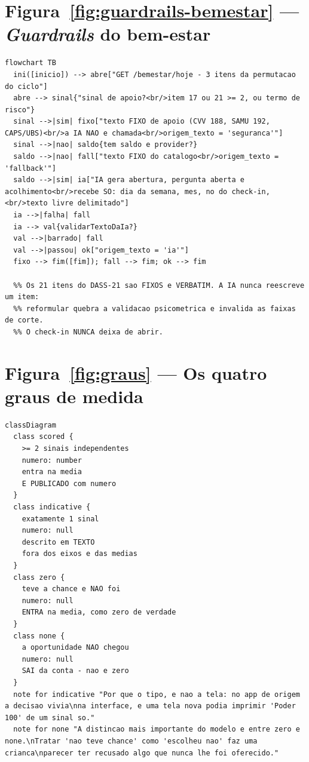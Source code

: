 \section{Figura~\ref{fig:guardrails-bemestar} --- \emph{Guardrails} do bem-estar}

\begin{lstlisting}[language=mermaid]
flowchart TB
  ini([inicio]) --> abre["GET /bemestar/hoje - 3 itens da permutacao do ciclo"]
  abre --> sinal{"sinal de apoio?<br/>item 17 ou 21 >= 2, ou termo de risco"}
  sinal -->|sim| fixo["texto FIXO de apoio (CVV 188, SAMU 192, CAPS/UBS)<br/>a IA NAO e chamada<br/>origem_texto = 'seguranca'"]
  sinal -->|nao| saldo{tem saldo e provider?}
  saldo -->|nao| fall["texto FIXO do catalogo<br/>origem_texto = 'fallback'"]
  saldo -->|sim| ia["IA gera abertura, pergunta aberta e acolhimento<br/>recebe SO: dia da semana, mes, no do check-in,<br/>texto livre delimitado"]
  ia -->|falha| fall
  ia --> val{validarTextoDaIa?}
  val -->|barrado| fall
  val -->|passou| ok["origem_texto = 'ia'"]
  fixo --> fim([fim]); fall --> fim; ok --> fim

  %% Os 21 itens do DASS-21 sao FIXOS e VERBATIM. A IA nunca reescreve um item:
  %% reformular quebra a validacao psicometrica e invalida as faixas de corte.
  %% O check-in NUNCA deixa de abrir.
\end{lstlisting}

\section{Figura~\ref{fig:graus} --- Os quatro graus de medida}

\begin{lstlisting}[language=mermaid]
classDiagram
  class scored {
    >= 2 sinais independentes
    numero: number
    entra na media
    E PUBLICADO com numero
  }
  class indicative {
    exatamente 1 sinal
    numero: null
    descrito em TEXTO
    fora dos eixos e das medias
  }
  class zero {
    teve a chance e NAO foi
    numero: null
    ENTRA na media, como zero de verdade
  }
  class none {
    a oportunidade NAO chegou
    numero: null
    SAI da conta - nao e zero
  }
  note for indicative "Por que o tipo, e nao a tela: no app de origem a decisao vivia\nna interface, e uma tela nova podia imprimir 'Poder 100' de um sinal so."
  note for none "A distincao mais importante do modelo e entre zero e none.\nTratar 'nao teve chance' como 'escolheu nao' faz uma crianca\nparecer ter recusado algo que nunca lhe foi oferecido."
\end{lstlisting}

